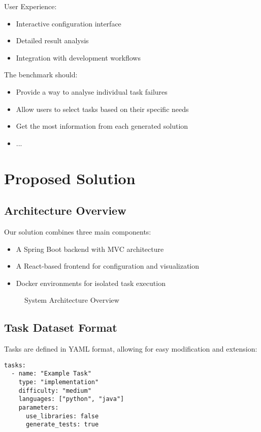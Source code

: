 User Experience:
\begin{itemize}
    \item Interactive configuration interface
    \item Detailed result analysis
    \item Integration with development workflows
\end{itemize}

The benchmark should:
\begin{itemize}
    \item Provide a way to analyse individual task failures
    \item Allow users to select tasks based on their specific needs
    \item Get the most information from each generated solution
    \item ...
\end{itemize}

\chapter{Proposed Solution}

\section{Architecture Overview}

Our solution combines three main components:
\begin{itemize}
    \item A Spring Boot backend with MVC architecture
    \item A React-based frontend for configuration and visualization
    \item Docker environments for isolated task execution
\end{itemize}

\begin{figure}[h]
    \centering
    \caption{System Architecture Overview}
    \label{fig:architecture}
\end{figure}

\section{Task Dataset Format}

Tasks are defined in YAML format, allowing for easy modification and extension:

\begin{verbatim}
tasks:
  - name: "Example Task"
    type: "implementation"
    difficulty: "medium"
    languages: ["python", "java"]
    parameters:
      use_libraries: false
      generate_tests: true
\end{verbatim}

